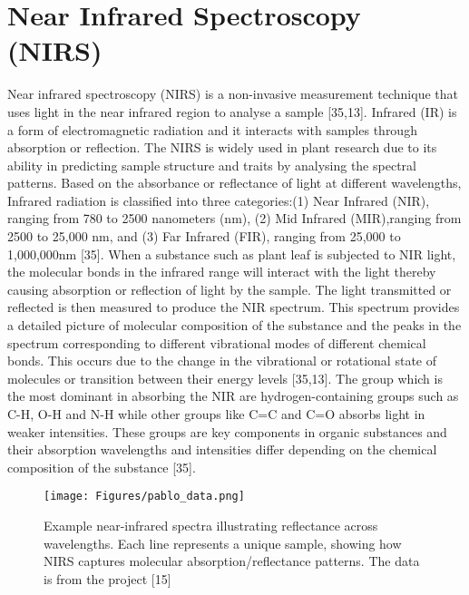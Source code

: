 \documentclass[12pt,a4paper]{report}
\begin{document}
\section{Near Infrared Spectroscopy (NIRS)}
Near infrared spectroscopy (NIRS) is a non-invasive measurement technique that uses light in
the near infrared region to analyse a sample [35,13]. Infrared (IR) is a form of electromagnetic
radiation and it interacts with samples through absorption or reflection. The NIRS is widely
used in plant research due to its ability in predicting sample structure and traits by analysing
the spectral patterns. Based on the absorbance or reflectance of light at different wavelengths, Infrared radiation is classified into three categories:(1) Near Infrared (NIR), ranging from 780 to 2500 nanometers (nm), (2) Mid Infrared (MIR),ranging from 2500 to 25,000 nm, and (3) Far Infrared (FIR), ranging from 25,000 to 1,000,000nm [35]. When a substance such as plant leaf is subjected to NIR light, the molecular bonds in the infrared range will interact with the light thereby causing absorption or reflection of light by the sample. The light transmitted or reflected is then measured to produce the NIR spectrum. This spectrum provides a detailed picture of molecular composition of the substance and the peaks in the spectrum corresponding to different vibrational modes of different chemical bonds. This occurs due to the change in the vibrational or rotational state of molecules or transition between their energy levels [35,13]. The group which is the most dominant in absorbing the NIR are hydrogen-containing groups such as C-H, O-H and N-H while other groups like C=C and C=O absorbs light in weaker intensities. These groups are key components in organic substances and their absorption wavelengths and intensities differ depending on the chemical composition of the substance [35].\\ 

\begin{figure}[h]
    \centering
    \texttt{[image: Figures/pablo\_data.png]} 
    \caption{Example near-infrared spectra illustrating reflectance across wavelengths. Each line represents a unique sample, showing how NIRS captures molecular absorption/reflectance patterns. The data is from the project [15]}
    \label{fig:nirs_spectra}
\end{figure}
\end{document}
